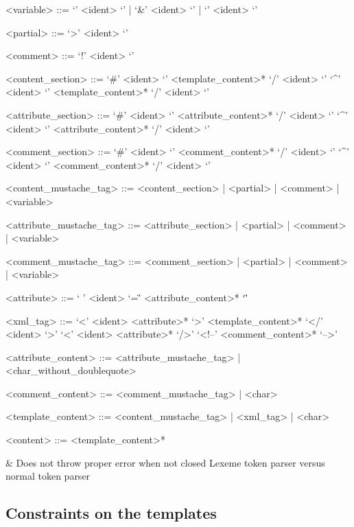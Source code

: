 \begin{grammar}
<variable> ::= `{{{' <ident> `}}}' | `{{&' <ident> `}}' | `{{' <ident> `}}'

<partial> ::= `{{>' <ident> `}}'

<comment> ::= `{{!' <ident> `}}'

<content\_section> ::= `{{#' <ident> `}}' <template\_content>* `{{/' <ident> `}}'
         \alt `{{^' <ident> `}}' <template\_content>* `{{/' <ident> `}}'

<attribute\_section> ::= `{{#' <ident> `}}' <attribute\_content>* `{{/' <ident> `}}'
                   \alt `{{^' <ident> `}}' <attribute\_content>* `{{/' <ident> `}}'

<comment\_section> ::= `{{\#' <ident> `}}' <comment\_content>* `{{/' <ident> `}}'
                 \alt `{{^' <ident> `}}' <comment\_content>* `{{/' <ident> `}}'

<content\_mustache\_tag> ::= <content\_section> | <partial> | <comment> | <variable>

<attribute\_mustache\_tag> ::= <attribute\_section> | <partial> | <comment> | <variable>

<comment\_mustache\_tag> ::= <comment\_section> | <partial> | <comment> | <variable>

<attribute> ::= ` ' <ident> `=\"' <attribute\_content>* `\"' 

<xml\_tag> ::= `<' <ident> <attribute>* `>' <template\_content>* `</' <ident> `>'
         \alt `<' <ident> <attribute>* `/>'
         \alt `<!--' <comment\_content>* `-->'

<attribute\_content> ::= <attribute\_mustache\_tag> | <char\_without\_doublequote>

<comment\_content> ::= <comment\_mustache\_tag> | <char>

<template\_content> ::= <content\_mustache\_tag> | <xml\_tag> | <char>

<content> ::= <template\_content>*
\end{grammar}

\& Does not throw proper error when not closed
Lexeme token parser versus normal token parser

\subsection{Constraints on the templates}



